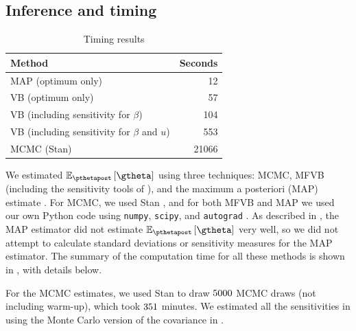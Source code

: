 \documentclass{article}\usepackage[]{graphicx}\usepackage[]{color}
\theoremstyle{plain}
\theoremstyle{definition}
\theoremstyle{plain}
\theoremstyle{plain}
\theoremstyle{plain}
\theoremstyle{plain}
\begin{document}
\subsection{Inference and timing\label{subsec:glmm_inference}}

\begin{table}[h]
\begin{center}%
\begin{tabular}{lr}
  \hline
Method & Seconds \\ 
  \hline
MAP (optimum only) & 12 \\ 
  VB (optimum only) & 57 \\ 
  VB (including sensitivity for $\beta$) & 104 \\ 
  VB (including sensitivity for $\beta$ and $u$) & 553 \\ 
  MCMC (Stan) & 21066 \\ 
   \hline
\end{tabular}
\end{center}
\caption{Timing results\label{tab:timing}}
\end{table}

We estimated $\epgtheta$ using three techniques: MCMC, MFVB (including
the sensitivity tools of ),
and the maximum a posteriori (MAP) estimate \citep[Chapter 13]{gelman:2014:bayesian}.
For MCMC, we used Stan \citep{stan-manual:2015}, and for both MFVB
and MAP we used our own Python code using \texttt{numpy}, \texttt{scipy},
and \texttt{autograd} \citep{scipy,maclaurin:2015:autograd}. As described
in , the MAP estimator
did not estimate $\epgtheta$ very well, so we did not attempt to
calculate standard deviations or sensitivity measures for the MAP
estimator. The summary of the computation time for all these methods
is shown in , with details below.

For the MCMC estimates, we used Stan to draw $5000$
MCMC draws (not including warm-up), which took $351$
minutes. We estimated all the sensitivities in 
using the Monte Carlo version of the covariance in . 
\end{document}
